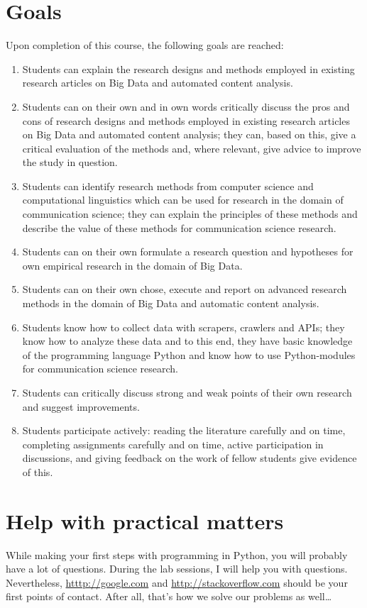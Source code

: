 \documentclass[a4paper,10pt]{report}
\begin{document}
\section{Goals}
Upon completion of this course, the following goals are reached:
\begin{enumerate}[A]
\item Students can explain the research designs and methods employed in existing research articles on Big Data and automated content analysis.
\item Students can on their own and in own words critically discuss the pros and cons of research designs and methods employed in existing research articles on Big Data and automated content analysis; they can, based on this, give a critical evaluation of the methods and, where relevant, give advice to improve the study in question.
\item Students can identify research methods from computer science and computational linguistics which can be used for research in the domain of communication science; they can explain the principles of these methods and describe the value of these methods for communication science research.
\item Students can on their own formulate a research question and hypotheses for own empirical research in the domain of Big Data.
\item Students can on their own chose, execute and report on advanced research methods in the domain of Big Data and automatic content analysis.
\item Students know how to collect data with scrapers, crawlers and APIs; they know how to analyze these data and to this end, they have basic knowledge of the programming language Python and know how to use Python-modules for communication science research.
\item Students can critically discuss  strong and weak points of their own research and suggest improvements.
\item Students participate actively: reading the literature carefully and on time, completing assignments carefully and on time, active participation in discussions, and giving feedback on the work of fellow students give evidence of this.
\end{enumerate}

\section{Help with practical matters}
While making your first steps with programming in Python, you will probably have a lot of questions. During the lab sessions, I will help you with questions. 
Nevertheless, \url{htttp://google.com} and \url{http://stackoverflow.com} should be your first points of contact. After all, that's how we solve our problems as well\ldots
\end{document}
